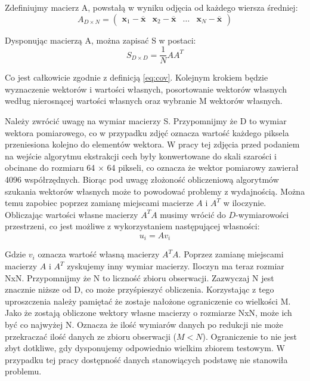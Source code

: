 \documentclass[oneside, eng]{mgr}
\newcommand{\bb}{\textbf}
\begin{document}
Zdefiniujmy macierz A, powstałą w wyniku odjęcia od każdego wiersza średniej:
\begin{equation}
	A_{D \times N} = 
	\left( \begin{array}{llll}
	\bb{x}_1 - \overline{\bb{x}} & \bb{x}_2 - \overline{\bb{x}} & \ldots & \bb{x}_N - \overline{\bb{x}}
	\end{array} \right)
\end{equation}


Dysponując macierzą A, można zapisać S w postaci:
\begin{equation}
	S_{D \times D} = \frac{1}{N} A A^T
\end{equation}

Co jest całkowicie zgodnie z definicją \ref{eq:cov}. Kolejnym krokiem będzie wyznaczenie wektorów i wartości własnych, posortowanie wektorów własnych według nierosnącej wartości własnych oraz wybranie M wektorów własnych. 

Należy zwrócić uwagę na wymiar macierzy S. Przypomnijmy że D to wymiar wektora pomiarowego, co w przypadku zdjęć oznacza wartość każdego piksela przeniesiona kolejno do elementów wektora. W pracy tej zdjęcia przed podaniem na wejście algorytmu ekstrakcji cech były konwertowane do skali szarości i obcinane do rozmiaru 64 $\times$ 64 pikseli, co oznacza że wektor pomiarowy zawierał 4096 współrzędnych. Biorąc pod uwagę złożoność obliczeniową algorytmów szukania wektorów własnych może to powodować problemy z wydajnością. Można temu zapobiec poprzez zamianę miejscami macierze $A$ i $A^T$ w iloczynie. Obliczając wartości własne macierzy $A^T A$ musimy wrócić do $D$-wymiarowości przestrzeni, co jest możliwe z wykorzystaniem następującej własności:
\begin{equation}
	u_i = A v_i
\end{equation}

Gdzie $v_i$ oznacza wartość własną macierzy $A^T A$. Poprzez zamianę miejscami macierzy $A$ i $A^T$ zyskujemy inny wymiar macierzy. Iloczyn ma teraz rozmiar NxN. Przypomnijmy że N to liczność zbioru obserwacji. Zazwyczaj N jest znacznie niższe od D, co może przyśpieszyć obliczenia. Korzystając z tego uproszczenia należy pamiętać że zostaje nałożone ograniczenie co wielkości M. Jako że zostają obliczone wektory własne macierzy o rozmiarze NxN, może ich być co najwyżej N. Oznacza że ilość wymiarów danych po redukcji nie może przekraczać ilość danych ze zbioru obserwacji ($M < N$). Ograniczenie to nie jest zbyt dotkliwe, gdy dysponujemy odpowiednio wielkim zbiorem testowym. W przypadku tej pracy dostępność danych stanowiących podstawę nie stanowiła problemu.
\end{document}
